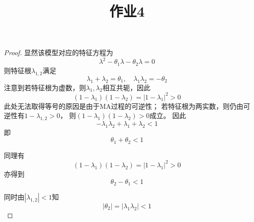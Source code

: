 \documentclass[cn]{homework}
\title{作业4}
\begin{document}
    \maketitle

    \problem
    \begin{proof}
        显然该模型对应的特征方程为
        \[\lambda^2-\theta_1\lambda-\theta_2\lambda=0\]
        则特征根$\lambda_{1,2}$满足
        \[\lambda_1+\lambda_2=\theta_1,
        \quad\lambda_1\lambda_2=-\theta_2\]
        注意到若特征根为虚数，则$\lambda_1,\lambda_2$相互共轭，因此
        \[(1-\lambda_1)(1-\lambda_2)=|1-\lambda_1|^2>0\]
        此处无法取得等号的原因是由于MA过程的可逆性；
        若特征根为两实数，则仍由可逆性有$1-\lambda_{1,2}>0$，
        则$(1-\lambda_1)(1-\lambda_2)>0$成立。
        因此
        \[-\lambda_1\lambda_2+\lambda_1+\lambda_2<1\]
        即
        \[\theta_1+\theta_2<1\]
        
        同理有
        \[(1-\lambda_1)(1-\lambda_2)=|1-\lambda_1|^2>0\]
        亦得到
        \[\theta_2-\theta_1<1\]

        同时由$|\lambda_{1,2}|<1$知
        \[|\theta_2|=|\lambda_1\lambda_2|<1\]
    \end{proof}

    \problem
\end{document}
